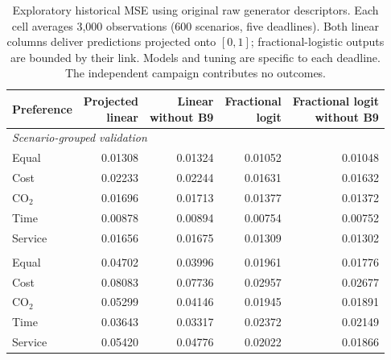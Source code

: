 \begin{table}[htbp]\centering\small
\begin{tabular}{lrrrr}\toprule
Preference & \shortstack{Projected\\linear} & \shortstack{Linear\\without B9} & \shortstack{Fractional\\logit} & \shortstack{Fractional logit\\without B9}\\\midrule
\multicolumn{5}{l}{\textit{Scenario-grouped validation}}\\
Equal & 0.01308 & 0.01324 & 0.01052 & 0.01048\\
Cost & 0.02233 & 0.02244 & 0.01631 & 0.01632\\
CO$_2$ & 0.01696 & 0.01713 & 0.01377 & 0.01372\\
Time & 0.00878 & 0.00894 & 0.00754 & 0.00752\\
Service & 0.01656 & 0.01675 & 0.01309 & 0.01302\\
\addlinespace
\multicolumn{5}{l}{\textit{Family-held-out validation}}\\
Equal & 0.04702 & 0.03996 & 0.01961 & 0.01776\\
Cost & 0.08083 & 0.07736 & 0.02957 & 0.02677\\
CO$_2$ & 0.05299 & 0.04146 & 0.01945 & 0.01891\\
Time & 0.03643 & 0.03317 & 0.02372 & 0.02149\\
Service & 0.05420 & 0.04776 & 0.02022 & 0.01866\\
\bottomrule
\end{tabular}
\caption{Exploratory historical MSE using original raw generator descriptors. Each cell averages 3,000 observations (600 scenarios, five deadlines). Both linear columns deliver predictions projected onto $[0,1]$; fractional-logistic outputs are bounded by their link. Models and tuning are specific to each deadline. The independent campaign contributes no outcomes.}\label{tab:bounded_legacy}
\end{table}
